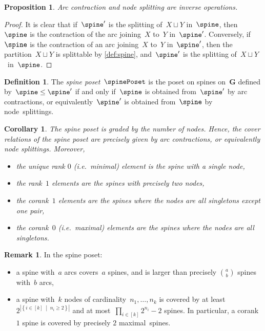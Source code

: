 \documentclass{amsart}
\newtheorem{corollary}[theorem]{Corollary}
\newtheorem{proposition}[theorem]{Proposition}
\theoremstyle{definition}
\newtheorem{definition}[theorem]{Definition}
\newtheorem{remark}[theorem]{Remark}
\renewcommand{\b}[1]{{\boldsymbol{#1}}} %
\newcommand{\set}[2]{\left\{ #1 \;\middle|\; #2 \right\}} %
\newcommand{\ie}{\textit{i.e.}~} %
\newcommand{\darkblue}{\color{darkblue}} %
\newcommand{\defn}[1]{\textsl{\darkblue #1}} %
\begin{document}
\begin{proposition}
  \label{prop:contractionSplitting}
  Arc contraction and node splitting are inverse operations.
\end{proposition}

\begin{proof}
  It is clear that if~$\spine'$ is the splitting of~$X \sqcup Y$ in~$\spine$, then~$\spine$ is the contraction of the arc joining~$X$ to~$Y$ in~$\spine'$.
  Conversely, if~$\spine$ is the contraction of an arc joining~$X$ to~$Y$ in~$\spine'$, then the partition~$X \sqcup Y$ is splittable by \cref{def:spine}, and~$\spine'$ is the splitting of~$X \sqcup Y$~in~$\spine$.
\end{proof}

\begin{definition}
  The \defn{spine poset}~$\spinePoset$ is the poset on spines on~$\b{G}$ defined by~$\spine \le \spine'$ if and only if~$\spine$ is obtained from~$\spine'$ by arc contractions, or equivalently~$\spine'$ is obtained from~$\spine$ by node~splittings.
\end{definition}

\begin{corollary} 
  The spine poset is graded by the number of nodes.
  Hence, the cover relations of the spine poset are precisely given by arc contractions, or equivalently node splittings.
  Moreover,
  \begin{itemize}
    \item the unique rank $0$ (\ie minimal) element is the spine with a single node, 
    \item the rank~$1$ elements are the spines with precisely two nodes, 
    \item the corank~$1$ elements are the spines where the nodes are all singletons except one pair,
    \item the corank~$0$ (\ie maximal) elements are the spines where the nodes are all singletons.
  \end{itemize}
\end{corollary}

\begin{remark}
  In the spine poset:
  \begin{itemize}
    \item a spine with~$a$ arcs covers~$a$ spines, and is larger than precisely $\binom{a}{b}$ spines with~$b$ arcs,
    \item a spine with~$k$ nodes of cardinality~$n_1, \dots, n_k$ is covered by at least~$2^{|\set{i \in [k]}{n_i \ge 2}|}$ and at most~$\prod_{i \in [k]} 2^{n_i}-2$ spines. In particular, a corank~$1$ spine is covered by precisely $2$ maximal~spines.
  \end{itemize}
\end{remark}
\end{document}
